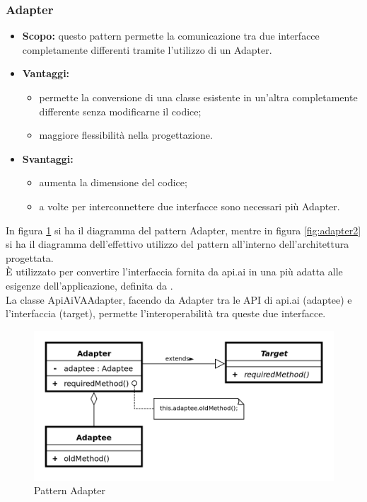     \subsubsection{Adapter}
      \begin{itemize}
       \item \textbf{Scopo:} questo pattern permette la comunicazione tra due interfacce completamente differenti tramite l'utilizzo di un Adapter.
	\item \textbf{Vantaggi:}
	  \begin{itemize}
	   \item permette la conversione di una classe esistente in un'altra completamente differente senza modificarne il codice;
	   \item maggiore flessibilità nella progettazione.
	  \end{itemize}
	\item \textbf{Svantaggi:}
	  \begin{itemize}
	   \item aumenta la dimensione del codice;
	   \item a volte per interconnettere due interfacce sono necessari più Adapter.
	  \end{itemize}
	\end{itemize}
	In figura \ref{fig:adapter1} si ha il diagramma del pattern Adapter, mentre in figura \ref{fig:adapter2} si ha il diagramma dell'effettivo utilizzo del pattern all'interno dell'architettura progettata.\\
È utilizzato per convertire l'interfaccia fornita da api.ai in una più adatta alle esigenze dell'applicazione, definita da . \\ La classe ApiAiVAAdapter, facendo da Adapter tra le API di api.ai (adaptee) e l'interfaccia  (target), permette l'interoperabilità tra queste due interfacce.
	\begin{figure}[h]
		\centering
		\includegraphics[width=\textwidth,height=\textheight,keepaspectratio,scale=0.1]{images/adapterpattern.png}
		\caption{Pattern Adapter}\label{fig:adapter1}
	\end{figure}
